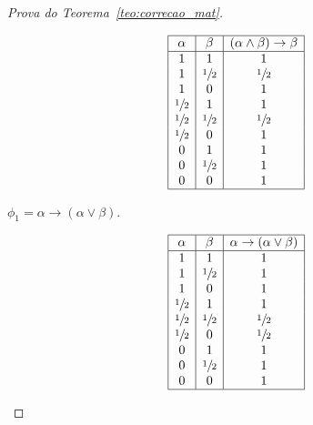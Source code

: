 \begin{proof}[Prova do Teorema~\ref{teo:correcao_mat}]
\begin{provaporcasos}
\begin{provaporsubcasos}
                \begin{center}
                    \[
                        \begin{array}{|c|c|c|}%
                            \hline%
                            \alpha      & \beta & (\alpha \land \beta) \to \beta \\
                            \hline%
                            1 & 1 & 1\\
                            1 & \meio{} & \meio{}\\
                            1 & 0 & 1\\
                            \meio{} & 1 & 1\\
                            \meio{} & \meio{} & \meio{}\\
                            \meio{} & 0 & 1\\
                            0 & 1 & 1\\
                            0 & \meio{} & 1\\
                            0 & 0 & 1\\
                            \hline%
                        \end{array}
                    \]
                \end{center}

                \subcasodeprova{} $\phi_{1} = \alpha \to (\alpha \lor \beta)$. 

                \begin{center}
                    \[
                        \begin{array}{|c|c|c|}%
                            \hline%
                            \alpha      & \beta & \alpha \to (\alpha \lor \beta) \\
                            \hline%
                            1 & 1 &1\\
                            1 & \meio{} &1\\
                            1 & 0 &1\\
                            \meio{} & 1 &1\\
                            \meio{} & \meio{} &\meio{}\\
                            \meio{} & 0 &\meio{}\\
                            0 & 1 &1\\
                            0 & \meio{} &1\\
                            0 & 0 &1\\
                            \hline%
                        \end{array}
                    \]
                \end{center}
                

\end{provaporsubcasos}
\end{provaporcasos}
\end{proof}
